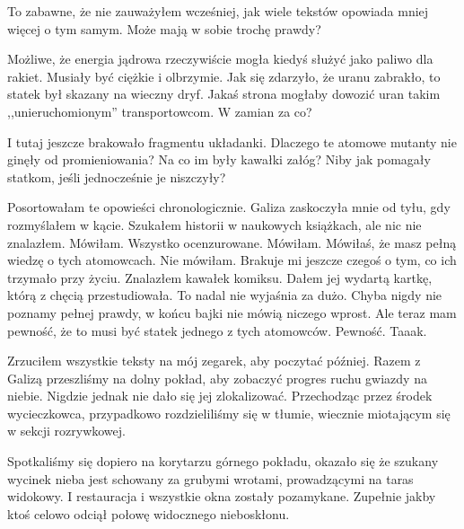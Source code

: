 To zabawne, że nie zauważyłem wcześniej, jak wiele tekstów  opowiada mniej więcej o tym samym. 
Może mają w sobie trochę prawdy?

Możliwe, że energia jądrowa rzeczywiście mogła kiedyś służyć jako paliwo dla rakiet. Musiały być ciężkie i olbrzymie.
Jak się zdarzyło, że uranu zabrakło, to statek był skazany na wieczny dryf.
Jakaś strona mogłaby dowozić uran takim ,,unieruchomionym'' transportowcom. W zamian za co?

I tutaj jeszcze brakowało fragmentu układanki. Dlaczego te atomowe mutanty nie ginęły od promieniowania? Na co im były kawałki załóg?
Niby jak pomagały statkom, jeśli jednocześnie je niszczyły?

\begin{dialogue}
	\ds{} Posortowałam te opowieści chronologicznie. \dm{} Galiza zaskoczyła mnie od tyłu, gdy rozmyślałem w kącie.
	\ds{} Szukałem historii w naukowych książkach, ale nic nie znalazłem.
	\ds{} Mówiłam.
	\ds{} Wszystko ocenzurowane.
	\ds{} Mówiłam.
	\ds{} Mówiłaś, że masz pełną wiedzę o tych atomowcach.
	\ds{} Nie mówiłam. Brakuje mi jeszcze czegoś o tym, co ich trzymało przy życiu.
	\ds{} Znalazłem kawałek komiksu. \dm{} Dałem jej wydartą kartkę, którą z chęcią przestudiowała.
	\ds{} To nadal nie wyjaśnia za dużo.
	\ds{} Chyba nigdy nie poznamy pełnej prawdy, w końcu bajki nie mówią niczego wprost.
	\ds{} Ale teraz mam pewność, że to musi być statek jednego z tych atomowców.
	\ds{} Pewność. Taaak.
\end{dialogue}

Zrzuciłem wszystkie teksty na mój zegarek, aby poczytać później.
Razem z Galizą przeszliśmy na dolny pokład, aby zobaczyć progres ruchu gwiazdy na niebie.
Nigdzie jednak nie dało się jej zlokalizować.
Przechodząc przez środek wycieczkowca, przypadkowo rozdzieliliśmy się w tłumie, wiecznie miotającym się w sekcji rozrywkowej.

Spotkaliśmy się dopiero na korytarzu górnego pokładu, okazało się że szukany wycinek nieba jest schowany za grubymi wrotami, prowadzącymi na taras widokowy.
I restauracja i wszystkie okna zostały pozamykane.
Zupełnie jakby ktoś celowo odciął połowę widocznego nieboskłonu.

